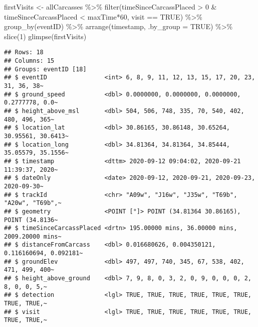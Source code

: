 \documentclass[
]{article}
\newenvironment{Shaded}{\begin{snugshade}}{\end{snugshade}}
\newcommand{\AttributeTok}[1]{\textcolor[rgb]{0.77,0.63,0.00}{#1}}
\newcommand{\ConstantTok}[1]{\textcolor[rgb]{0.00,0.00,0.00}{#1}}
\newcommand{\DecValTok}[1]{\textcolor[rgb]{0.00,0.00,0.81}{#1}}
\newcommand{\FunctionTok}[1]{\textcolor[rgb]{0.00,0.00,0.00}{#1}}
\newcommand{\NormalTok}[1]{#1}
\newcommand{\OtherTok}[1]{\textcolor[rgb]{0.56,0.35,0.01}{#1}}
\newcommand{\SpecialCharTok}[1]{\textcolor[rgb]{0.00,0.00,0.00}{#1}}
\begin{document}
\begin{Shaded}
\begin{Highlighting}[]
\NormalTok{firstVisits }\OtherTok{\textless{}{-}}\NormalTok{ allCarcasses }\SpecialCharTok{\%\textgreater{}\%}
  \FunctionTok{filter}\NormalTok{(timeSinceCarcassPlaced }\SpecialCharTok{\textgreater{}} \DecValTok{0} \SpecialCharTok{\&}\NormalTok{ timeSinceCarcassPlaced }\SpecialCharTok{\textless{}}\NormalTok{ maxTime}\SpecialCharTok{*}\DecValTok{60}\NormalTok{, visit }\SpecialCharTok{==} \ConstantTok{TRUE}\NormalTok{) }\SpecialCharTok{\%\textgreater{}\%}
  \FunctionTok{group\_by}\NormalTok{(eventID) }\SpecialCharTok{\%\textgreater{}\%}
  \FunctionTok{arrange}\NormalTok{(timestamp, }\AttributeTok{.by\_group =} \ConstantTok{TRUE}\NormalTok{) }\SpecialCharTok{\%\textgreater{}\%}
  \FunctionTok{slice}\NormalTok{(}\DecValTok{1}\NormalTok{)}
\FunctionTok{glimpse}\NormalTok{(firstVisits)}
\end{Highlighting}
\end{Shaded}

\begin{verbatim}
## Rows: 18
## Columns: 15
## Groups: eventID [18]
## $ eventID                <int> 6, 8, 9, 11, 12, 13, 15, 17, 20, 23, 31, 36, 38~
## $ ground_speed           <dbl> 0.0000000, 0.0000000, 0.0000000, 0.2777778, 0.0~
## $ height_above_msl       <dbl> 504, 506, 748, 335, 70, 540, 402, 480, 496, 365~
## $ location_lat           <dbl> 30.86165, 30.86148, 30.65264, 30.95561, 30.6413~
## $ location_long          <dbl> 34.81364, 34.81364, 34.85444, 35.05579, 35.1556~
## $ timestamp              <dttm> 2020-09-12 09:04:02, 2020-09-21 11:39:37, 2020~
## $ dateOnly               <date> 2020-09-12, 2020-09-21, 2020-09-23, 2020-09-30~
## $ trackId                <chr> "A09w", "J16w", "J35w", "T69b", "A20w", "T69b",~
## $ geometry               <POINT [°]> POINT (34.81364 30.86165), POINT (34.8136~
## $ timeSinceCarcassPlaced <drtn> 195.00000 mins, 36.00000 mins, 2009.20000 mins~
## $ distanceFromCarcass    <dbl> 0.016680626, 0.004350121, 0.116160694, 0.092181~
## $ groundElev             <dbl> 497, 497, 740, 345, 67, 538, 402, 471, 499, 400~
## $ height_above_ground    <dbl> 7, 9, 8, 0, 3, 2, 0, 9, 0, 0, 0, 2, 8, 0, 0, 5,~
## $ detection              <lgl> TRUE, TRUE, TRUE, TRUE, TRUE, TRUE, TRUE, TRUE,~
## $ visit                  <lgl> TRUE, TRUE, TRUE, TRUE, TRUE, TRUE, TRUE, TRUE,~
\end{verbatim}
\end{document}
